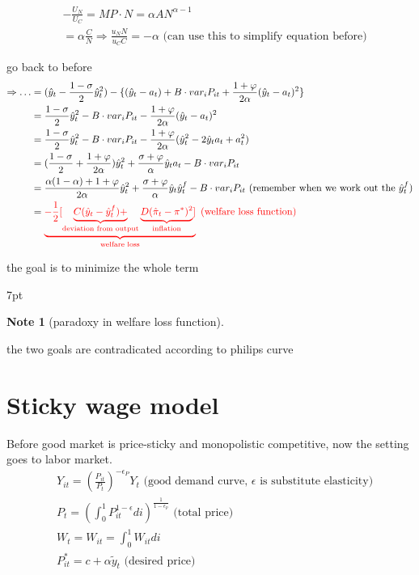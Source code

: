 \documentclass{article}
\newenvironment{blueblock}{
\def\FrameCommand{
  \hspace{1pt}
    {\color{DarkBlue}
    \vrule width 2pt}
    {\color{blueshade}
    \vrule width 4pt}
  \colorbox{blueshade}
}
\MakeFramed{
  \advance
  \hsize-
  \width
  \FrameRestore}
\noindent\hspace{-4.55pt}%
\begin{adjustwidth}{}{7pt}
\vspace{2pt}\vspace{2pt}
}
{\vspace{2pt}\end{adjustwidth}\endMakeFramed}
\newtheorem{note}{Note}
\begin{document}
\begin{align}
& -\frac{U_N}{U_C}=MP \cdot N=\alpha A N^{\alpha-1}
\\& = \alpha \frac{C}{N} \Rightarrow \frac{u_N N}{u_C C}=-\alpha\text{ (can use this to simplify equation before)}
\end{align}

go back to before 
\begin{align}
\Rightarrow \dots & = (\hat y_t -\frac{1-\sigma}{2}\hat y_t^2)-\{(\hat y_t -a_t)+B \cdot var_i P_{it}+\frac{1+\varphi}{2 \alpha}(\hat y_t -a_t)^2\}
\\& =\frac{1-\sigma}{2}\hat y_t^2 -B \cdot var_i P_{it}-\frac{1+\varphi}{2 \alpha}(\hat y_t -a_t)^2
\\& = \frac{1-\sigma}{2}\hat y_t^2 -B \cdot var_i P_{it}-\frac{1+\varphi}{2 \alpha}(\hat y_t^2-2 \hat y_t a_t +a_t^2)
\\& = (\frac{1-\sigma}{2}+\frac{1+\varphi}{2 \alpha})\hat y_t^2 + \frac{\sigma+\varphi}{\alpha}\hat y_t a_t -B \cdot var_i P_{it}
\\& =  \frac{\alpha (1-\alpha)+1+\varphi}{2 \alpha}\hat y_t^2 + \frac{\sigma+\varphi}{\alpha}\hat y_t \hat y_t^f -B \cdot var_i P_{it} \text{ (remember when we work out the $\hat y_t^f$)}
\\& = 
\color{red}
\underbrace{
-\frac{1}{2}[
\underbrace{
C(\hat y_t -\hat y_t^f)+
}_\text{deviation from output}
\underbrace{
D(\hat \pi_t - \pi^*)^2
}_\text{inflation}
]
}_\text{welfare loss} \text{ (welfare loss function)}
\end{align}

the goal is to minimize the whole term


\begin{blueblock}
\begin{note}[paradoxy in welfare loss function]
\end{note}
the two goals are contradicated according to philips curve
\end{blueblock}



\newpage
\section{Sticky wage model}

Before good market is price-sticky and monopolistic competitive, now the setting goes to labor market.
\begin{align}
& Y_{it}=(\frac{P_{it}}{P_t})^{-\epsilon_P}Y_t
\text{ (good demand curve, $\epsilon$ is substitute elasticity)}
\\& P_t=(\int_0^1P_{it}^{1-\epsilon}di)^{\frac{1}{1-\epsilon_p}}\text{ (total price)}
\\& W_t=W_{it}=\int_0^1 W_{it}di
\\& P^*_{it}=c+\alpha \tilde y_t \text{ (desired price)}
\end{align}
\end{document}

